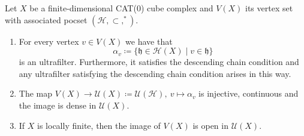 \begin{thm}
  \label{thm:roller-compactification}
  Let \(X\) be a finite-dimensional CAT(0) cube complex and \(V(X)\) its vertex set with associated pocset \((\mathcal{H}, \subset, ^\ast)\).
  \begin{enumerate}
  \item For every vertex \(v \in V(X)\) we have that
    \[
      \alpha_v \coloneqq \{\mathfrak{h} \in \mathcal{H}(X) \mid v \in \mathfrak{h}\}
    \]
    is an ultrafilter. Furthermore, it satisfies the descending chain condition and any ultrafilter satisfying the descending chain condition arises in this way.
  \item The map \(V(X) \to \mathcal{U}(X) \coloneqq \mathcal{U}(\mathcal{H}),\ v \mapsto \alpha_v\) is injective, continuous and the image is dense in \(\mathcal{U}(X)\). 
  \item If \(X\) is locally finite, then the image of \(V(X)\) is open in \(\mathcal{U}(X)\).
  \end{enumerate}
\end{thm}


